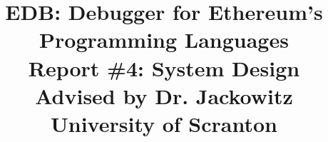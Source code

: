 \documentclass[]{article}
\title{%
	EDB: Debugger for Ethereum's Programming Languages \\
	\medskip
	\large Report \#4: System Design \\
	\large Advised by Dr. Jackowitz	\\
	\large University of Scranton}
\author{}
\begin{document}
\maketitle

\begin{abstract}

\end{abstract}

\section{}
\end{document}

